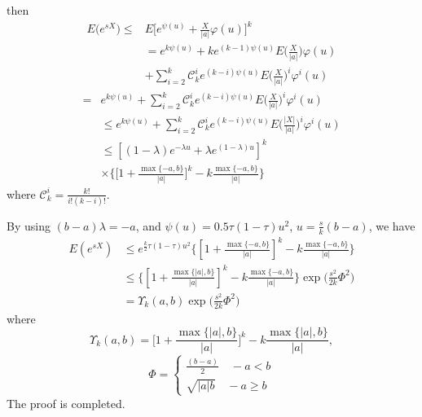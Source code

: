 \documentclass[journal]{IEEEtran}
\begin{document}
\begin{IEEEproof}
then
   \begin{equation}
   \begin{split}
    E\big(e^{s X}\big)\leq{}& E\Big[e^{\psi(u)}+\frac{X}{|a|}\varphi(u)\Big]^k\\
    &= e^{k\psi(u)}+ke^{(k-1)\psi(u)}E\Big(\frac{X}{|a|}\Big)\varphi(u)\\
    &+\sum_{i=2}^k \mathcal{C}_k^i e^{(k-i)\psi(u)}E\Big(\frac{X}{|a|}\Big)^i\varphi^i(u)
    \end{split}
    \end{equation}
    \begin{equation}
    \begin{split}
    =&e^{k\psi(u)}+\sum_{i=2}^k \mathcal{C}_k^i e^{(k-i)\psi(u)}E\Big(\frac{X}{|a|}\Big)^i\varphi^i(u)\\
    &\leq e^{k\psi(u)}+\sum_{i=2}^k \mathcal{C}_k^i e^{(k-i)\psi(u)}E\Big(\frac{|X|}{|a|}\Big)^i\varphi^i(u)\\
        &  \leq [(1-\lambda)e^{-\lambda u}+\lambda e^{(1-\lambda)u}]^k\\
       & \times \Big\{\Big[1+\frac{\max\{-a,b\}}{|a|}\Big]^k-k\frac{\max\{-a,b\}}{|a|}\Big\}
       \end{split}
   \end{equation}
   where $\mathcal{C}_k^i=\frac{k!}{i!(k-i)!}$.

By using $(b-a)\lambda=-a$, and $\psi(u)=0.5 \tau (1-\tau)u^2$, $u=\frac{s}{k}(b-a)$, we have
\begin{equation}
\begin{split}
  E(e^{s X})&\leq e^{\frac{k}{2}\tau(1-\tau)u^2} \Big\{[1+\frac{\max\{-a,b\}}{|a|}]^k-k\frac{\max\{-a,b\}}{|a|}\Big\} \\
  &\leq \Big \{[1+\frac{\max\{|a|,b\}}{|a|}]^k-k\frac{\max\{-a,b\}}{|a|}\Big \} \exp\Big(\frac{s^2}{2k}\Phi^2\Big)\\
  &= \Upsilon_k (a,b)\exp\Big(\frac{s^2}{2k}\Phi^2\Big)
  \end{split}
\end{equation}
where
\begin{equation}
\Upsilon_k(a,b)=\Big[1+\frac{\max\{|a|,b\}}{|a|}\Big]^k-k\frac{\max\{|a|,b\}}{|a|},
\end{equation}
\begin{equation}
  \Phi = \begin{cases} \frac{(b-a)}{2} \quad  -a<b \\
      \sqrt{|a|b} \quad -a \geq b
  \end{cases}
\end{equation}
The proof is completed.
\end{IEEEproof}
\end{document}
